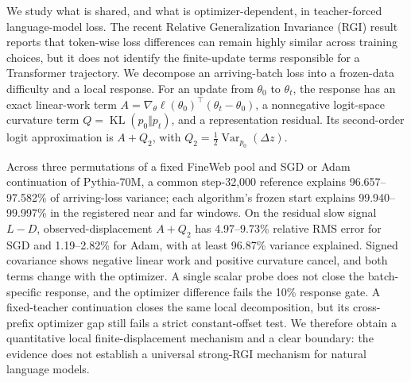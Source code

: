 We study what is shared, and what is optimizer-dependent, in teacher-forced language-model loss.  The recent Relative Generalization Invariance (RGI) result reports that token-wise loss differences can remain highly similar across training choices, but it does not identify the finite-update terms responsible for a Transformer trajectory.  We decompose an arriving-batch loss into a frozen-data difficulty and a local response.  For an update from \(\theta_0\) to \(\theta_t\), the response has an exact linear-work term \(A=\nabla_\theta\ell(\theta_0)^\top(\theta_t-\theta_0)\), a nonnegative logit-space curvature term \(Q=\operatorname{KL}(p_0\Vert p_t)\), and a representation residual.  Its second-order logit approximation is \(A+Q_2\), with \(Q_2=\tfrac12\operatorname{Var}_{p_0}(\Delta z)\).

Across three permutations of a fixed FineWeb pool and SGD or Adam continuation of Pythia-70M, a common step-32,000 reference explains 96.657--97.582\% of arriving-loss variance; each algorithm's frozen start explains 99.940--99.997\% in the registered near and far windows.  On the residual slow signal \(L-D\), observed-displacement \(A+Q_2\) has 4.97--9.73\% relative RMS error for SGD and 1.19--2.82\% for Adam, with at least 96.87\% variance explained.  Signed covariance shows negative linear work and positive curvature cancel, and both terms change with the optimizer.  A single scalar probe does not close the batch-specific response, and the optimizer difference fails the 10\% response gate.  A fixed-teacher continuation closes the same local decomposition, but its cross-prefix optimizer gap still fails a strict constant-offset test.  We therefore obtain a quantitative local finite-displacement mechanism and a clear boundary: the evidence does not establish a universal strong-RGI mechanism for natural language models.
